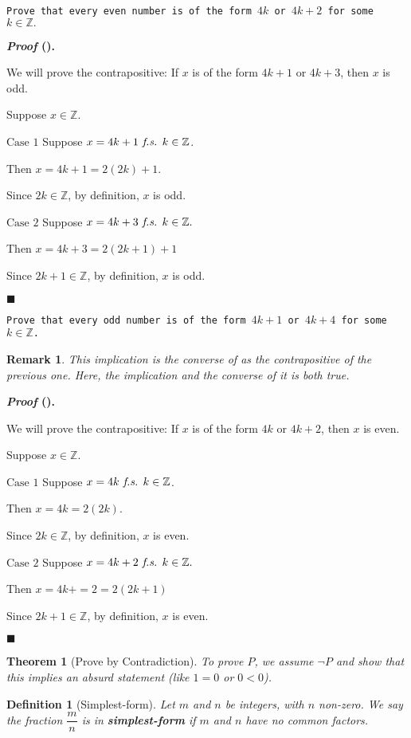 \documentclass[12pt,a4paper]{article}
\newcounter{nprf}[subsection]
\newtheorem{thm}{Theorem}[subsection]
\newtheorem{df}{Definition}[subsection]
\newtheorem*{rmk}{\indent Remark}
\newenvironment*{prf}{\par\indent\textbf{\textit{Proof} (\stepcounter{nprf}\thenprf). }\par}{\par\hfill $\blacksquare$\par}
\def\Z{{\mathbb{Z}}}
\def\fs{\emph{ f.s. }}
\begin{document}
\begin{framed}
\noindent\texttt{Prove that every even number is of the form $4k$ or $4k+2$ for some $k\in\Z.$}
\begin{prf}
	We will prove the contrapositive: If $x$ is of the form $4k+1$ or $4k+3$, then $x$ is odd. \par Suppose $x\in\Z$.\par $\boxed{\text{Case }1}$ Suppose $x=4k+1\fs k\in\Z$. \par Then $x=4k+1=2(2k)+1$.\par Since $2k\in\Z$, by definition, $x$ is odd. \par $\boxed{\text{Case }2}$ Suppose $x=4k+3\fs k\in\Z.$\par Then $x=4k+3=2(2k+1)+1$\par Since $2k+1\in\Z$, by definition, $x$ is odd. 
\end{prf}
\end{framed}
\begin{framed}
\noindent\texttt{Prove that every odd number is of the form $4k+1$ or $4k+4$ for some $k\in\Z$.}
\begin{rmk}	This implication is the converse of  as the contrapositive of the previous one. Here, the implication and the converse of it is both true.\end{rmk}
\begin{prf}
	We will prove the contrapositive: If $x$ is of the form $4k$ or $4k+2$, then $x$ is even.\par Suppose $x\in\Z.$ \par $\boxed{\text{Case }1}$ Suppose $x=4k\fs k\in\Z$. \par Then $x=4k=2(2k)$.\par Since $2k\in\Z$, by definition, $x$ is even. \par $\boxed{\text{Case }2}$ Suppose $x=4k+2\fs k\in\Z.$\par Then $x=4k+=2=2(2k+1)$\par Since $2k+1\in\Z$, by definition, $x$ is even. 
\end{prf}
\end{framed}
\begin{thm}[Prove by Contradiction]
	To prove $P$, we assume $\neg P$ and show that this implies an absurd statement (like $1=0$ or $0<0$).
\end{thm}
\begin{df}[Simplest-form]
	Let $m$ and $n$ be integers, with $n$ non-zero. We say the fraction $\dfrac{m}{n}$ is in \textbf{simplest-form} if $m$ and $n$ have no common factors.	
\end{df}
\end{document}
